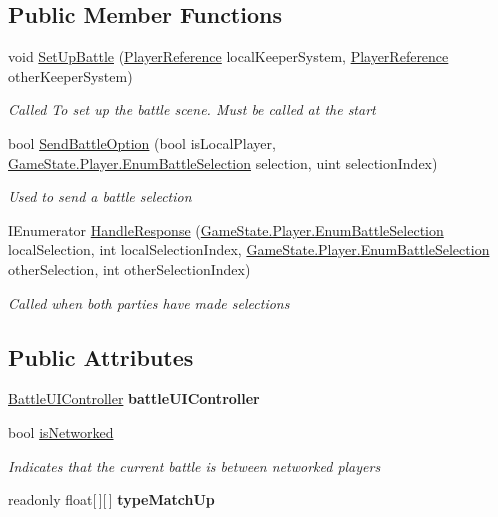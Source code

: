 \subsection*{Public Member Functions}
\begin{DoxyCompactItemize}
\item 
void \hyperlink{class_battle_handler_ab27ebc9022c6d8e60c065432240484ff}{Set\-Up\-Battle} (\hyperlink{class_player_reference}{Player\-Reference} local\-Keeper\-System, \hyperlink{class_player_reference}{Player\-Reference} other\-Keeper\-System)
\begin{DoxyCompactList}\small\item\em Called To set up the battle scene. Must be called at the start \end{DoxyCompactList}\item 
bool \hyperlink{class_battle_handler_ad207e2adf6f1f3882e98b1c8a5f59f67}{Send\-Battle\-Option} (bool is\-Local\-Player, \hyperlink{struct_game_state_1_1_player_a9f54c5eca1e60acbaa2074e981f51615}{Game\-State.\-Player.\-Enum\-Battle\-Selection} selection, uint selection\-Index)
\begin{DoxyCompactList}\small\item\em Used to send a battle selection \end{DoxyCompactList}\item 
I\-Enumerator \hyperlink{class_battle_handler_a9899956562c6a887611411ea4682957a}{Handle\-Response} (\hyperlink{struct_game_state_1_1_player_a9f54c5eca1e60acbaa2074e981f51615}{Game\-State.\-Player.\-Enum\-Battle\-Selection} local\-Selection, int local\-Selection\-Index, \hyperlink{struct_game_state_1_1_player_a9f54c5eca1e60acbaa2074e981f51615}{Game\-State.\-Player.\-Enum\-Battle\-Selection} other\-Selection, int other\-Selection\-Index)
\begin{DoxyCompactList}\small\item\em Called when both parties have made selections \end{DoxyCompactList}\end{DoxyCompactItemize}
\subsection*{Public Attributes}
\begin{DoxyCompactItemize}
\item 
\hypertarget{class_battle_handler_ad57da165c3aa4c3906b10dc80cca73e2}{\hyperlink{class_battle_u_i_controller}{Battle\-U\-I\-Controller} {\bfseries battle\-U\-I\-Controller}}\label{class_battle_handler_ad57da165c3aa4c3906b10dc80cca73e2}

\item 
bool \hyperlink{class_battle_handler_a91faa80b5273370273762c40a364305d}{is\-Networked}
\begin{DoxyCompactList}\small\item\em Indicates that the current battle is between networked players \end{DoxyCompactList}\item 
readonly float\mbox{[}$\,$\mbox{]}\mbox{[}$\,$\mbox{]} {\bfseries type\-Match\-Up}
\end{DoxyCompactItemize}
